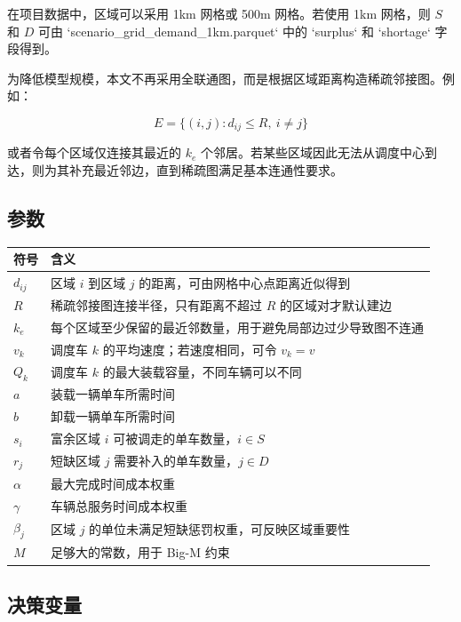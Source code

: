 \documentclass[UTF8,a4paper,12pt]{ctexart}
\begin{document}
在项目数据中，区域可以采用 1km 网格或 500m 网格。若使用 1km 网格，则 \(S\) 和 \(D\) 可由 `scenario\_grid\_demand\_1km.parquet` 中的 `surplus` 和 `shortage` 字段得到。

为降低模型规模，本文不再采用全联通图，而是根据区域距离构造稀疏邻接图。例如：

\[
E=\{(i,j):d_{ij}\le R,\ i\ne j\}
\]

或者令每个区域仅连接其最近的 \(k_e\) 个邻居。若某些区域因此无法从调度中心到达，则为其补充最近邻边，直到稀疏图满足基本连通性要求。

\subsection{参数}

\begin{longtable}{>{\centering\arraybackslash}p{3cm}p{11cm}}
\toprule
符号 & 含义 \\
\midrule
\endhead
\(d_{ij}\) & 区域 \(i\) 到区域 \(j\) 的距离，可由网格中心点距离近似得到 \\
\(R\) & 稀疏邻接图连接半径，只有距离不超过 \(R\) 的区域对才默认建边 \\
\(k_e\) & 每个区域至少保留的最近邻数量，用于避免局部边过少导致图不连通 \\
\(v_k\) & 调度车 \(k\) 的平均速度；若速度相同，可令 \(v_k=v\) \\
\(Q_k\) & 调度车 \(k\) 的最大装载容量，不同车辆可以不同 \\
\(a\) & 装载一辆单车所需时间 \\
\(b\) & 卸载一辆单车所需时间 \\
\(s_i\) & 富余区域 \(i\) 可被调走的单车数量，\(i\in S\) \\
\(r_j\) & 短缺区域 \(j\) 需要补入的单车数量，\(j\in D\) \\
\(\alpha\) & 最大完成时间成本权重 \\
\(\gamma\) & 车辆总服务时间成本权重 \\
\(\beta_j\) & 区域 \(j\) 的单位未满足短缺惩罚权重，可反映区域重要性 \\
\(M\) & 足够大的常数，用于 Big-M 约束 \\
\bottomrule
\end{longtable}

\subsection{决策变量}
\end{document}
